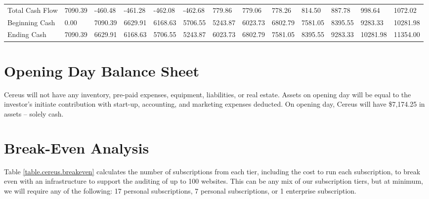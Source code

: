 \begin{sidewaystable}
\begin{table}[H]
\begin{tabularx}{\textwidth}{X X X X X X X X X X X X X}
    \multicolumn{1}{l}{Total Cash Flow} & 7090.39 & -460.48 & -461.28 & -462.08 & -462.68 & 779.86 & 779.06 & 778.26 & 814.50 & 887.78 & 998.64 & 1072.02  \\
    \multicolumn{1}{l}{Beginning Cash} & 0.00 & 7090.39 & 6629.91 & 6168.63 & 5706.55 & 5243.87 & 6023.73 & 6802.79 & 7581.05 & 8395.55 & 9283.33 & 10281.98  \\
    \multicolumn{1}{l}{Ending Cash} & 7090.39 & 6629.91 & 6168.63 & 5706.55 & 5243.87 & 6023.73 & 6802.79 & 7581.05 & 8395.55 & 9283.33 & 10281.98 & 11354.00  \\

  \end{tabularx}
  \label{table.cash.flow}
\end{table}
\end{sidewaystable}

\section{Opening Day Balance Sheet}

Cereus will not have any inventory, pre-paid expenses, equipment, liabilities, or real estate. Assets on opening day will be equal to the investor's initiate contribution with start-up, accounting, and marketing expenses deducted. On opening day, Cereus will have \$7,174.25 in assets -- solely cash.

\section{Break-Even Analysis}

Table \ref{table.cereus.breakeven} calculates the number of subscriptions from each tier, including the cost to run each subscription, to break even with an infrastructure to support the auditing of up to 100 websites. This can be any mix of our subscription tiers, but at minimum, we will require any of the following: 17 personal subscriptions, 7 personal subscriptions, or 1 enterprise subscription.
